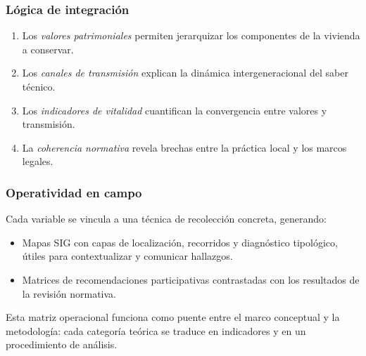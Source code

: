 \subsubsection{Lógica de integración}

\begin{enumerate}
	\item Los \emph{valores patrimoniales} permiten jerarquizar los
	      componentes de la vivienda a conservar.
	\item Los \emph{canales de transmisión} explican la dinámica
	      intergeneracional del saber técnico.
	\item Los \emph{indicadores de vitalidad} cuantifican la convergencia
	      entre valores y transmisión.
	\item La \emph{coherencia normativa} revela brechas entre la práctica
	      local y los marcos legales.
\end{enumerate}

\subsubsection{Operatividad en campo}

Cada variable se vincula a una técnica de recolección concreta, generando:

\begin{itemize}
	\item Mapas SIG con capas de localización, recorridos y diagnóstico
	      tipológico, útiles para contextualizar y comunicar hallazgos.
	\item Matrices de recomendaciones participativas contrastadas con los
	      resultados de la revisión normativa.
\end{itemize}

Esta matriz operacional funciona como puente entre el marco conceptual y
la metodología: cada categoría teórica se traduce en indicadores y en un
procedimiento de análisis.
